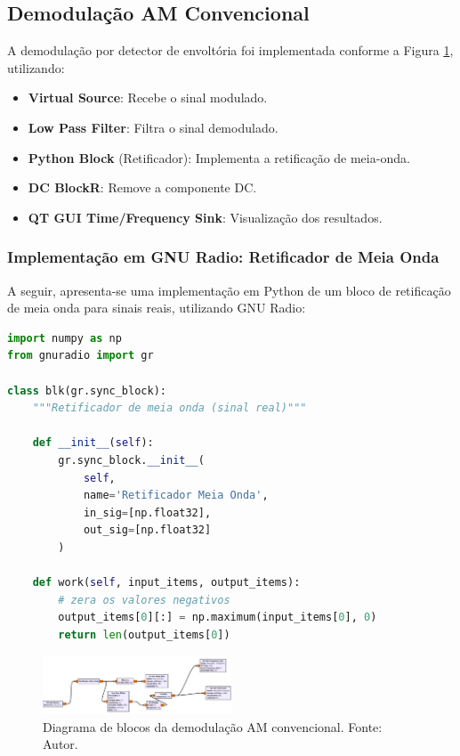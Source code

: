 \subsection{Demodulação AM Convencional}

A demodulação por detector de envoltória foi implementada conforme a Figura \ref{fig:demodulacao_am_gnu}, utilizando:

\begin{itemize}
    \item \textbf{Virtual Source}: Recebe o sinal modulado.
    \item \textbf{Low Pass Filter}: Filtra o sinal demodulado.
    \item \textbf{Python Block} (Retificador): Implementa a retificação de meia-onda.
    \item \textbf{DC BlockR}: Remove a componente DC.
    \item \textbf{QT GUI Time/Frequency Sink}: Visualização dos resultados.
\end{itemize}


\subsubsection*{Implementação em GNU Radio: Retificador de Meia Onda}

A seguir, apresenta-se uma implementação em Python de um bloco de retificação de meia onda para sinais reais, utilizando GNU Radio:

\begin{lstlisting}[language=Python, caption={Implementação do retificador de meia onda}]
import numpy as np
from gnuradio import gr

class blk(gr.sync_block):
    """Retificador de meia onda (sinal real)"""

    def __init__(self):
        gr.sync_block.__init__(
            self,
            name='Retificador Meia Onda',
            in_sig=[np.float32],
            out_sig=[np.float32]
        )

    def work(self, input_items, output_items):
        # zera os valores negativos
        output_items[0][:] = np.maximum(input_items[0], 0)
        return len(output_items[0])
\end{lstlisting}


\begin{figure}
    \centering
    \includegraphics[width=0.5\textwidth]{images/demodulcao_am_convencional_gnu.png}
    \caption{Diagrama de blocos da demodulação AM convencional. Fonte: Autor.}
    \label{fig:demodulacao_am_gnu}
\end{figure}

